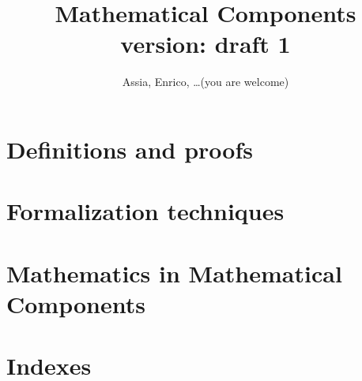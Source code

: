 \documentclass{book}
\title{Mathematical Components\\\small{version: draft 1}}
\author{Assia, Enrico, \ldots (you are welcome)}
\begin{document}
\maketitle



\tableofcontents{}

\part{Definitions and proofs}






\part{Formalization techniques}





\part{Mathematics in Mathematical Components}







\part{Indexes}

\printindex[concept]
\printindex[ssr]
\printindex[coq]
\printindex[vernac]



\end{document}
